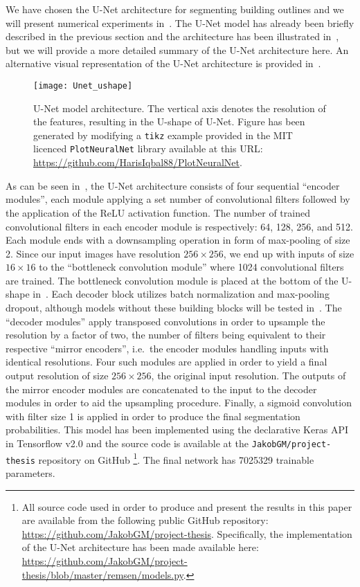 We have chosen the U-Net architecture for segmenting building outlines and we will present numerical experiments in~.
The U-Net model has already been briefly described in the previous section and the architecture has been illustrated in~, but we will provide a more detailed summary of the U-Net architecture here.
An alternative visual representation of the U-Net architecture is provided in~.

\begin{figure}[htb]
  \texttt{[image: Unet\_ushape]}
  \caption{%
    U-Net model architecture.
    The vertical axis denotes the resolution of the features, resulting in the U-shape of U-Net.
    Figure has been generated by modifying a \texttt{tikz} example provided in the MIT licenced \texttt{PlotNeuralNet} library available at this URL:\@
    \protect\url{https://github.com/HarisIqbal88/PlotNeuralNet}.
  }%
  \label{fig:unet2}
\end{figure}

As can be seen in~, the U-Net architecture consists of four sequential \enquote{encoder modules}, each module applying a set number of convolutional filters followed by the application of the ReLU activation function.
The number of trained convolutional filters in each encoder module is respectively: 64, 128, 256, and 512.
Each module ends with a downsampling operation in form of max-pooling of size 2.
Since our input images have resolution $256 \times 256$, we end up with inputs of size $16 \times 16$ to the \enquote{bottleneck convolution module} where 1024 convolutional filters are trained.
The bottleneck convolution module is placed at the bottom of the U-shape in~.
Each decoder block utilizes batch normalization and max-pooling dropout, although models without these building blocks will be tested in~.
The \enquote{decoder modules} apply transposed convolutions in order to upsample the resolution by a factor of two, the number of filters being equivalent to their respective \enquote{mirror encoders}, i.e.\ the encoder modules handling inputs with identical resolutions.
Four such modules are applied in order to yield a final output resolution of size $256 \times 256$, the original input resolution.
The outputs of the mirror encoder modules are concatenated to the input to the decoder modules in order to aid the upsampling procedure.
Finally, a sigmoid convolution with filter size \num{1} is applied in order to produce the final segmentation probabilities.
This model has been implemented using the declarative Keras API in Tensorflow v2.0 and the source code is available at the \texttt{JakobGM/project-thesis} repository on GitHub%
\footnote{%
  All source code used in order to produce and present the results in this paper are available from the following public GitHub repository: \url{https://github.com/JakobGM/project-thesis}.
  Specifically, the implementation of the U-Net architecture has been made available here: \url{https://github.com/JakobGM/project-thesis/blob/master/remsen/models.py}.
}.
The final network has \num{7025329} trainable parameters.
